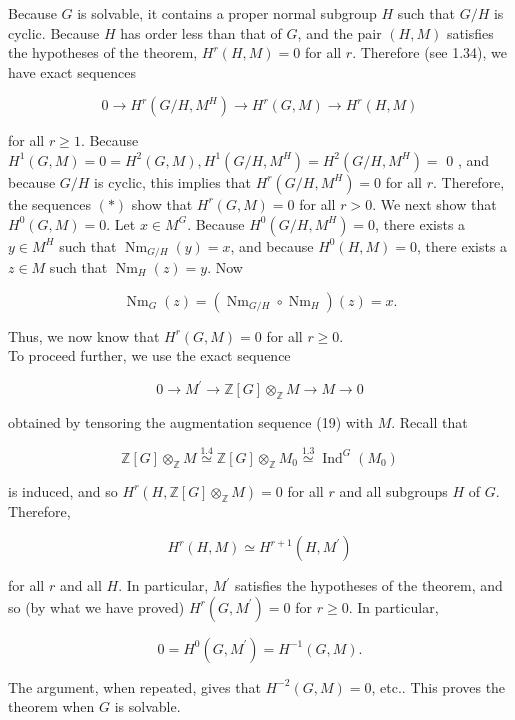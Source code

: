 \documentclass[10pt]{article}
\begin{document}
Because $G$ is solvable, it contains a proper normal subgroup $H$ such that $G / H$ is cyclic. Because $H$ has order less than that of $G$, and the pair $(H, M)$ satisfies the hypotheses of the theorem, $H^{r}(H, M)=0$ for all $r$. Therefore (see 1.34), we have exact sequences


\begin{equation*}
0 \rightarrow H^{r}\left(G / H, M^{H}\right) \rightarrow H^{r}(G, M) \rightarrow H^{r}(H, M) \tag{*}
\end{equation*}


for all $r \geq 1$. Because $H^{1}(G, M)=0=H^{2}(G, M), H^{1}\left(G / H, M^{H}\right)=H^{2}\left(G / H, M^{H}\right)=$ 0 , and because $G / H$ is cyclic, this implies that $H^{r}\left(G / H, M^{H}\right)=0$ for all $r$. Therefore, the sequences $(*)$ show that $H^{r}(G, M)=0$ for all $r>0$. We next show that $H^{0}(G, M)=0$. Let $x \in M^{G}$. Because $H^{0}\left(G / H, M^{H}\right)=0$, there exists a $y \in M^{H}$ such that $\operatorname{Nm}_{G / H}(y)=x$, and because $H^{0}(H, M)=0$, there exists a $z \in M$ such that $\operatorname{Nm}_{H}(z)=y$. Now

$$
\operatorname{Nm}_{G}(z)=\left(\operatorname{Nm}_{G / H} \circ \operatorname{Nm}_{H}\right)(z)=x .
$$

Thus, we now know that $H^{r}(G, M)=0$ for all $r \geq 0$.\\
To proceed further, we use the exact sequence

$$
0 \rightarrow M^{\prime} \rightarrow \mathbb{Z}[G] \otimes_{\mathbb{Z}} M \rightarrow M \rightarrow 0
$$

obtained by tensoring the augmentation sequence (19) with $M$. Recall that

$$
\mathbb{Z}[G] \otimes_{\mathbb{Z}} M \stackrel{1.4}{\simeq} \mathbb{Z}[G] \otimes_{\mathbb{Z}} M_{0} \stackrel{1.3}{\simeq} \operatorname{Ind}^{G}\left(M_{0}\right)
$$

is induced, and so $H^{r}\left(H, \mathbb{Z}[G] \otimes_{\mathbb{Z}} M\right)=0$ for all $r$ and all subgroups $H$ of $G$. Therefore,

$$
H^{r}(H, M) \simeq H^{r+1}\left(H, M^{\prime}\right)
$$

for all $r$ and all $H$. In particular, $M^{\prime}$ satisfies the hypotheses of the theorem, and so (by what we have proved) $H^{r}\left(G, M^{\prime}\right)=0$ for $r \geq 0$. In particular,

$$
0=H^{0}\left(G, M^{\prime}\right)=H^{-1}(G, M) .
$$

The argument, when repeated, gives that $H^{-2}(G, M)=0$, etc.. This proves the theorem when $G$ is solvable.
\end{document}
